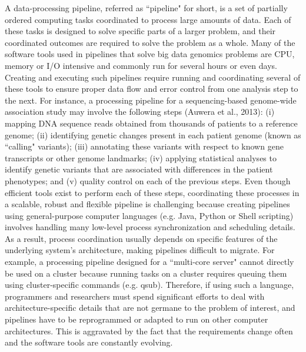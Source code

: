 A data-processing pipeline, referred as ``pipeline" for short, is a set of partially ordered computing tasks coordinated to process large amounts of data. Each of these tasks is designed to solve specific parts of a larger problem, and their coordinated outcomes are required to solve the problem as a whole. Many of the software tools used in pipelines that solve big data genomics problems are CPU, memory or I/O intensive and commonly run for several hours or even days. Creating and executing such pipelines require running and coordinating several of these tools to ensure proper data flow and error control from one analysis step to the next. For instance, a processing pipeline for a sequencing-based genome-wide association study may involve the following steps (Auwera et al., 2013): (i) mapping DNA sequence reads obtained from thousands of patients to a reference genome; (ii) identifying genetic changes present in each patient genome (known as ``calling" variants); (iii) annotating these variants with respect to known gene transcripts or other genome landmarks; (iv) applying statistical analyses to identify genetic variants that are associated with differences in the patient phenotypes; and (v) quality control on each of the previous steps. Even though efficient tools exist to perform each of these steps, coordinating these processes in a scalable, robust and flexible pipeline is challenging because creating pipelines using general-purpose computer languages (e.g. Java, Python or Shell scripting) involves handling many low-level process synchronization and scheduling details. As a result, process coordination usually depends on specific features of the underlying system’s architecture, making pipelines difficult to migrate. For example, a processing pipeline designed for a ``multi-core server" cannot directly be used on a cluster because running tasks on a cluster requires queuing them using cluster-specific commands (e.g. qsub). Therefore, if using such a language, programmers and researchers must spend significant efforts to deal with architecture-specific details that are not germane to the problem of interest, and pipelines have to be reprogrammed or adapted to run on other computer architectures. This is aggravated by the fact that the requirements change often and the software tools are constantly evolving.

